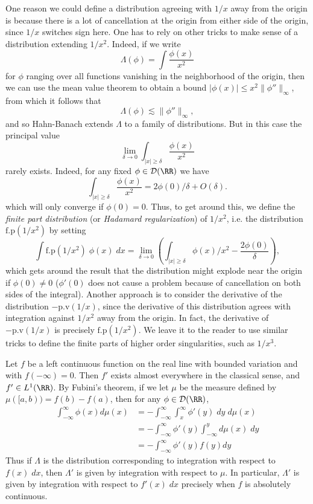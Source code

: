 \begin{example}
    One reason we could define a distribution agreeing with $1/x$ away from the origin is because there is a lot of cancellation at the origin from either side of the origin, since $1/x$ switches sign here. One has to rely on other tricks to make sense of a distribution extending $1/x^2$. Indeed, if we write
    \[ \Lambda(\phi) = \int \frac{\phi(x)}{x^2} \]
    for $\phi$ ranging over all functions vanishing in the neighborhood of the origin, then we can use the mean value theorem to obtain a bound $|\phi(x)| \leq x^2 \| \phi'' \|_\infty$, from which it follows that
    \[ \Lambda(\phi) \lesssim \| \phi'' \|_\infty, \]
    and so Hahn-Banach extends $\Lambda$ to a family of distributions. But in this case the principal value
    \[ \lim_{\delta \to 0} \int_{|x| \geq \delta} \frac{\phi(x)}{x^2} \]
    rarely exists. Indeed, for any fixed $\phi \in \mathcal{D}(\RR)$ we have
    \[ \int_{|x| \geq \delta} \frac{\phi(x)}{x^2} = 2 \phi(0) / \delta + O(\delta). \]
    which will only converge if $\phi(0) = 0$. Thus, to get around this, we define the \emph{finite part distribution} (or \emph{Hadamard regularization}) of $1/x^2$, i.e. the distribution $\text{f.p}(1/x^2)$ by setting
    \[ \int \text{f.p}(1/x^2)\; \phi(x)\; dx = \lim_{\delta \to 0} \left( \int_{|x| \geq \delta} \phi(x)/x^2 - \frac{2 \phi(0)}{\delta} \right), \]
    which gets around the result that the distribution might explode near the origin if $\phi(0) \neq 0$ ($\phi'(0)$ does not cause a problem because of cancellation on both sides of the integral). Another approach is to consider the derivative of the distribution $- \text{p.v}(1/x)$, since the derivative of this distribution agrees with integration against $1/x^2$ away from the origin. In fact, the derivative of $- \text{p.v}(1/x)$ is precisely $\text{f.p}(1/x^2)$. We leave it to the reader to use similar tricks to define the finite parts of higher order singularities, such as $1/x^3$.
\end{example}

\begin{example}
    Let $f$ be a left continuous function on the real line with bounded variation and with $f(-\infty) = 0$. Then $f'$ exists almost everywhere in the classical sense, and $f' \in L^1(\RR)$. By Fubini's theorem, if we let $\mu$ be the measure defined by $\mu([a,b)) = f(b) - f(a)$, then for any $\phi \in \mathcal{D}(\RR)$,
    \begin{align*}
        \int_{-\infty}^\infty \phi(x) d\mu(x) &= - \int_{-\infty}^\infty \int_x^\infty \phi'(y)\; dy\; d\mu(x)\\
        &= - \int_{-\infty}^\infty \phi'(y) \int_{-\infty}^y d\mu(x)\; dy\\
        &= - \int_{-\infty}^\infty \phi'(y) f(y) dy
    \end{align*}
    Thus if $\Lambda$ is the distribution corresponding to integration with respect to $f(x)\; dx$, then $\Lambda'$ is given by integration with respect to $\mu$. In particular, $\Lambda'$ is given by integration with respect to $f'(x)\; dx$ precisely when $f$ is absolutely continuous.
\end{example}

